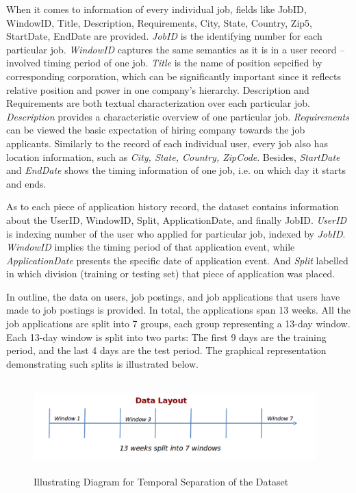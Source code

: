 \documentclass{article} %
\begin{document}
When it comes to information of every individual job, fields like JobID,
WindowID, Title, Description, Requirements, City, State, Country, Zip5,
StartDate, EndDate are provided.
{\it JobID} is the identifying number for each particular job. 
{\it WindowID} captures the same semantics as it is in a user record --
involved timing period of one job.
{\it Title} is the name of position sepcified by corresponding corporation, which
can be significantly important since it reflects relative position and power
in one company's hierarchy. 
Description and Requirements are both textual characterization
over each particular job. 
{\it Description} provides a
characteristic overview of one particular job. 
{\it Requirements} can be
viewed the basic expectation of hiring company towards the job applicants.
Similarly to the record of each individual user, every job also has location
information, such as {\it City, State, Country, ZipCode}. 
Besides, {\it StartDate} and {\it EndDate} shows the timing information of one job,
i.e. on which day it starts and ends. 

As to each piece of application history record, the dataset contains information
about the UserID, WindowID, Split, ApplicationDate, and finally JobID. 
{\it UserID} is indexing number of the user who applied for particular job,
indexed by {\it JobID}. 
{\it WindowID} implies the timing period of that application event, while
{\it ApplicationDate} presents the specific date of application event. 
And {\it Split} labelled in which division (training or testing set) that
piece of application was placed.

In outline, the data on users, job postings, and job applications that
users have made to job postings is provided. In total, the applications span
13 weeks. All the job applications are split into 7 groups, each group
representing a 13-day window. Each 13-day window is split into two parts: The
first 9 days are the training period, and the last 4 days are the test period.
The graphical representation demonstrating such splits is illustrated below.
\begin{figure}[h]
    \begin{center}
        \includegraphics[width=4.3in,height=1.4in]{./fig/datalayout.png}
        \caption{Illustrating Diagram for Temporal Separation of the Dataset}
    \end{center}
\end{figure}
\end{document}
